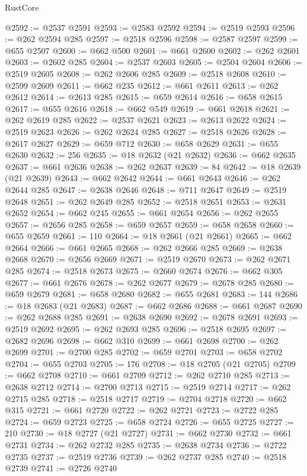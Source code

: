\begin{lexlean}{RustCore}
\begin{coremodule}
@2592 := @2537 @2591
@2593 := @2583 @2592
@2594 := @2519 @2593
@2596 := @262 @2594 @285
@2597 := @2518 @2596
@2598 := @2587 @2597
@2599 := @655 @2507
@2600 := @662 @500
@2601 := @661 @2600
@2602 := @262 @2601
@2603 := @2602 @285
@2604 := @2537 @2603
@2605 := @2504 @2604
@2606 := @2519 @2605
@2608 := @262 @2606 @285
@2609 := @2518 @2608
@2610 := @2599 @2609
@2611 := @662 @235
@2612 := @661 @2611
@2613 := @262 @2612
@2614 := @2613 @285
@2615 := @659 @2614
@2616 := @658 @2615
@2617 := @655 @2616
@2618 := @662 @549
@2619 := @661 @2618
@2621 := @262 @2619 @285
@2622 := @2537 @2621
@2623 := @2613 @2622
@2624 := @2519 @2623
@2626 := @262 @2624 @285
@2627 := @2518 @2626
@2628 := @2617 @2627
@2629 := @659 @712
@2630 := @658 @2629
@2631 := @655 @2630
@2632 := 256
@2635 := @18 @2632 (@21 @2632)
@2636 := @662 @2635
@2637 := @661 @2636
@2638 := @262 @2637
@2639 := 84
@2642 := @18 @2639 (@21 @2639)
@2643 := @662 @2642
@2644 := @661 @2643
@2646 := @262 @2644 @285
@2647 := @2638 @2646
@2648 := @711 @2647
@2649 := @2519 @2648
@2651 := @262 @2649 @285
@2652 := @2518 @2651
@2653 := @2631 @2652
@2654 := @662 @245
@2655 := @661 @2654
@2656 := @262 @2655
@2657 := @2656 @285
@2658 := @659 @2657
@2659 := @658 @2658
@2660 := @655 @2659
@2661 := 110
@2664 := @18 @2661 (@21 @2661)
@2665 := @662 @2664
@2666 := @661 @2665
@2668 := @262 @2666 @285
@2669 := @2638 @2668
@2670 := @2656 @2669
@2671 := @2519 @2670
@2673 := @262 @2671 @285
@2674 := @2518 @2673
@2675 := @2660 @2674
@2676 := @662 @305
@2677 := @661 @2676
@2678 := @262 @2677
@2679 := @2678 @285
@2680 := @659 @2679
@2681 := @658 @2680
@2682 := @655 @2681
@2683 := 144
@2686 := @18 @2683 (@21 @2683)
@2687 := @662 @2686
@2688 := @661 @2687
@2690 := @262 @2688 @285
@2691 := @2638 @2690
@2692 := @2678 @2691
@2693 := @2519 @2692
@2695 := @262 @2693 @285
@2696 := @2518 @2695
@2697 := @2682 @2696
@2698 := @662 @310
@2699 := @661 @2698
@2700 := @262 @2699
@2701 := @2700 @285
@2702 := @659 @2701
@2703 := @658 @2702
@2704 := @655 @2703
@2705 := 176
@2708 := @18 @2705 (@21 @2705)
@2709 := @662 @2708
@2710 := @661 @2709
@2712 := @262 @2710 @285
@2713 := @2638 @2712
@2714 := @2700 @2713
@2715 := @2519 @2714
@2717 := @262 @2715 @285
@2718 := @2518 @2717
@2719 := @2704 @2718
@2720 := @662 @315
@2721 := @661 @2720
@2722 := @262 @2721
@2723 := @2722 @285
@2724 := @659 @2723
@2725 := @658 @2724
@2726 := @655 @2725
@2727 := 210
@2730 := @18 @2727 (@21 @2727)
@2731 := @662 @2730
@2732 := @661 @2731
@2734 := @262 @2732 @285
@2735 := @2638 @2734
@2736 := @2722 @2735
@2737 := @2519 @2736
@2739 := @262 @2737 @285
@2740 := @2518 @2739
@2741 := @2726 @2740

\end{coremodule}
\end{lexlean}
